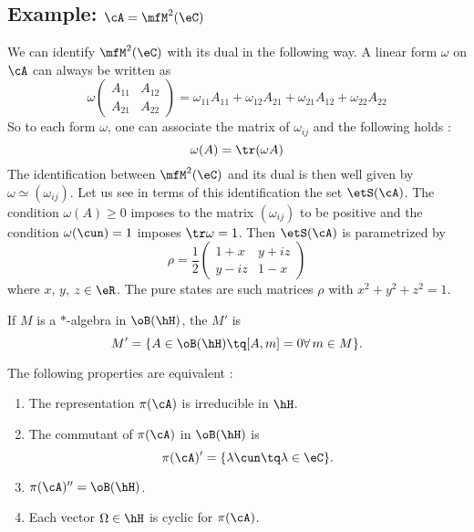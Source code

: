 \subsection*{Example: \texorpdfstring{$\cA=\mfM^2(\eC)$}{A=M2C}} 
We can identify $\mfM^2(\eC)$ with its dual in the following way. A linear form $\omega$ on $\cA$ can always be written as
\[ 
  \omega
\begin{pmatrix}
 A_{11}&A_{12}\\
A_{21}&A_{22}
\end{pmatrix}
=\omega_{11}A_{11} +\omega_{12}A_{21}+ \omega_{21}A_{12}+ \omega_{22}A_{22} 
\]
So to each form $\omega$, one can associate the matrix of $\omega_{ij}$ and the following holds :
\[ 
  \omega(A)=\tr(\omega A)
\]
The identification between $\mfM^2(\eC)$ and its dual is then well given by $\omega\simeq(\omega_{ij})$. Let us see in terms of this identification the set $\etS(\cA)$. The condition $\omega(A)\geq 0$ imposes to the matrix $(\omega_{ij})$ to be positive and the condition $\omega(\cun)=1$ imposes $\tr\omega=1$. Then $\etS(\cA)$ is parametrized by 
\[ 
  \rho=\frac{ 1 }{2}
\begin{pmatrix}
1+x&y+iz\\
y-iz&1-x
\end{pmatrix}
\]
where $x$, $y$, $z\in\eR$. The pure states are such matrices $\rho$ with $x^2+y^2+z^2=1$.

If $M$ is a $*$-algebra in $\oB(\hH)$, the  $M'$ is 
\[ 
  M'=\{ A\in\oB(\hH)\tq [A,m]=0    \forall\, m\in M \}.
\]

\begin{proposition} 
The following properties are equivalent :

\begin{enumerate}
 \item \label{enumgz} The representation $\pi(\cA)$ is irreducible in $\hH$.
\item\label{enumgi} The commutant of $\pi(\cA)$ in $\oB(\hH)$ is
\[ 
  \pi(\cA)'=\{ \lambda\cun\tq\lambda\in\eC \}.
\]
\item \label{enumgii} $\pi(\cA)''=\oB(\hH)$.

\item \label{enumgiii} Each vector $\Omega\in\hH$ is cyclic for $\pi(\cA)$.

\end{enumerate}
 \label{prop_equiv_rep_irred}
\end{proposition}

